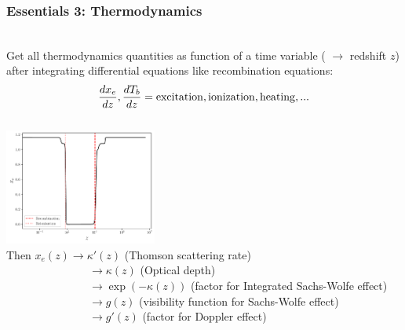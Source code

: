 \begin{frame}[fragile]
\frametitle{Essentials 3: Thermodynamics}

\mbox{}\\
Get all thermodynamics quantities as function of a time variable ({\Red \CLASS{}} $\rightarrow$ redshift $z$) after integrating differential equations like recombination equations:
$$
\frac{d x_e}{dz} , \frac{d T_b}{dz}= {\rm excitation}, {\rm ionization}, {\rm heating}, ... 
$$
\vspace{-0.5cm}\\
{\centering
\includegraphics[width=5cm,angle=0]{Figures/xe.pdf}\\}
Then $x_e(z) \rightarrow \kappa'(z)$ (Thomson scattering rate)\\
~~~~~~~~~~~~~~~$\rightarrow \kappa(z)$ (Optical depth)\\
~~~~~~~~~~~~~~~$\rightarrow \exp(-\kappa(z))$ (factor for Integrated Sachs-Wolfe effect)\\
~~~~~~~~~~~~~~~$\rightarrow g(z)$ (visibility function for Sachs-Wolfe effect)\\
~~~~~~~~~~~~~~~$\rightarrow g'(z)$ (factor for Doppler effect)\\

\end{frame}


